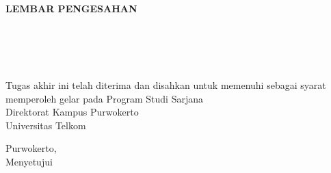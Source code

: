 {\singlespacing\centering
\textbf{\large LEMBAR PENGESAHAN}\\
\vspace{0.5cm}
\textbf{\Title}\\
\vspace{0.5cm}
\textbf{\textit{\EngTitle}}\\
\vspace{0.5cm}
\textbf{\NIM}\\
\textbf{\Author}\\
\vspace{1cm}


{ Tugas akhir ini telah diterima dan disahkan untuk memenuhi sebagai syarat memperoleh gelar pada Program Studi Sarjana \Prodi\\ Direktorat Kampus Purwokerto\\ Universitas Telkom}\\

\vspace{0.5cm}

{Purwokerto, \Tanggal\quad \Bulan \quad \Date}\\
{Menyetujui}\\

}

